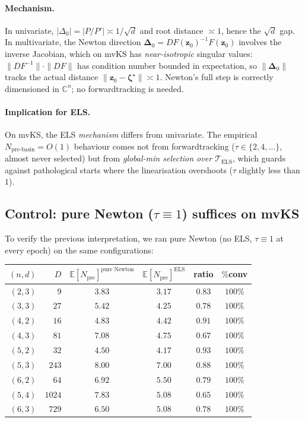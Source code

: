 \documentclass[11pt,a4paper]{article}
\begin{document}
\paragraph{Mechanism.}
In univariate, $|\Delta_0| = |P/P'| \asymp 1/\sqrt d$ and root distance $\asymp 1$, hence the $\sqrt d$ gap. In multivariate, the Newton direction $\boldsymbol{\Delta}_0 = DF(\mathbf z_0)^{-1} F(\mathbf z_0)$ involves the inverse Jacobian, which on mvKS has \emph{near-isotropic} singular values: $\|DF^{-1}\| \cdot \|DF\|$ has condition number bounded in expectation, so $\|\boldsymbol{\Delta}_0\|$ tracks the actual distance $\|\mathbf z_0 - \boldsymbol\zeta^\star\| \asymp 1$. Newton's full step is correctly dimensioned in $\mathbb{C}^n$; no forwardtracking is needed.

\paragraph{Implication for ELS.}
On mvKS, the ELS \emph{mechanism} differs from univariate. The empirical $N_{\text{pre-basin}} = O(1)$ behaviour comes not from forwardtracking ($\tau \in \{2, 4, \dots\}$, almost never selected) but from \emph{global-min selection over $\mathcal T_{\text{ELS}}$}, which guards against pathological starts where the linearisation overshoots ($\tau$ slightly less than $1$).

\subsection{Control: pure Newton ($\tau \equiv 1$) suffices on mvKS}

To verify the previous interpretation, we ran pure Newton (no ELS, $\tau \equiv 1$ at every epoch) on the same configurations:

\begin{center}
\begin{tabular}{rrcccc}
\toprule
$(n, d)$ & $D$ & $\mathbb{E}[N_{\text{pre}}]^{\text{pure Newton}}$ & $\mathbb{E}[N_{\text{pre}}]^{\text{ELS}}$ & ratio & $\%$conv \\
\midrule
$(2, 3)$ & $9$    & $3.83$ & $3.17$ & $0.83$ & $100\%$ \\
$(3, 3)$ & $27$   & $5.42$ & $4.25$ & $0.78$ & $100\%$ \\
$(4, 2)$ & $16$   & $4.83$ & $4.42$ & $0.91$ & $100\%$ \\
$(4, 3)$ & $81$   & $7.08$ & $4.75$ & $0.67$ & $100\%$ \\
$(5, 2)$ & $32$   & $4.50$ & $4.17$ & $0.93$ & $100\%$ \\
$(5, 3)$ & $243$  & $8.00$ & $7.00$ & $0.88$ & $100\%$ \\
$(6, 2)$ & $64$   & $6.92$ & $5.50$ & $0.79$ & $100\%$ \\
$(5, 4)$ & $1024$ & $7.83$ & $5.08$ & $0.65$ & $100\%$ \\
$(6, 3)$ & $729$  & $6.50$ & $5.08$ & $0.78$ & $100\%$ \\
\bottomrule
\end{tabular}
\end{center}
\end{document}
